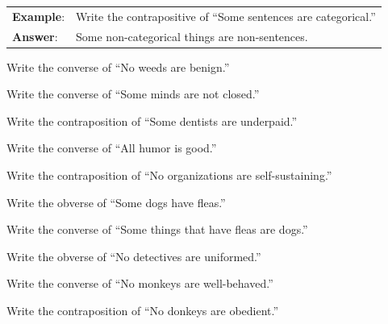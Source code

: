 \begin{longtabu}{p{.1\linewidth}p{.9\linewidth}}
\textbf{Example}: & Write the contrapositive of ``Some sentences are categorical.''\\
\textbf{Answer}: & Some non-categorical things are non-sentences. \\
\end{longtabu}

\begin{exercises}
\item Write the converse of ``No weeds are benign.''
 
\item Write the converse of ``Some minds are not closed.'' 

\item Write the contraposition of ``Some dentists are underpaid.'' 

\item Write the converse of ``All humor is good.'' 

\item Write the contraposition of ``No organizations are self-sustaining.'' 

\item Write the obverse of ``Some dogs have fleas.'' 

\item Write the converse of ``Some things that have fleas are dogs.'' 

\item Write the obverse of ``No detectives are uniformed.'' 

\item Write the converse of ``No monkeys are well-behaved.'' 

\item Write the contraposition of ``No donkeys are obedient.'' 

\end{exercises}

